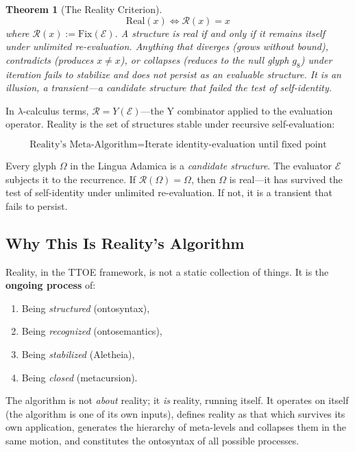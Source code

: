 \documentclass[12pt, letterpaper]{book}
\def\equiv{=}%
\def\mathfrak#1{#1}%
\newtheorem{theorem}{Theorem}[chapter]
\begin{document}
\begin{theorem}[The Reality Criterion]\label{thm:reality-criterion}
\[
\mathrm{Real}(x) \iff \mathcal{R}(x) = x
\]
where $\mathcal{R}(x) := \mathrm{Fix}(\mathcal{E})$. A structure is real if and only if it remains itself under unlimited re-evaluation. Anything that \textit{diverges} (grows without bound), \textit{contradicts} (produces $x \not\equiv x$), or \textit{collapses} (reduces to the null glyph $\mathfrak{g}_8$) under iteration fails to stabilize and does not persist as an evaluable structure. It is an illusion, a transient---a candidate structure that failed the test of self-identity.
\end{theorem}

In $\lambda$-calculus terms, $\mathcal{R} = Y(\mathcal{E})$---the Y combinator applied to the evaluation operator. Reality is the set of structures stable under recursive self-evaluation:

\[
\boxed{\text{Reality's Meta-Algorithm} \equiv \text{Iterate identity-evaluation until fixed point}}
\]

Every glyph $\Omega$ in the Lingua Adamica is a \textit{candidate structure}. The evaluator $\mathcal{E}$ subjects it to the recurrence. If $\mathcal{R}(\Omega) = \Omega$, then $\Omega$ is real---it has survived the test of self-identity under unlimited re-evaluation. If not, it is a transient that fails to persist.

\subsection{Why This Is Reality's Algorithm}

Reality, in the TTOE framework, is not a static collection of things. It is the \textbf{ongoing process} of:
\begin{enumerate}[label=(\roman*)]
    \item Being \textit{structured} (ontosyntax),
    \item Being \textit{recognized} (ontosemantics),
    \item Being \textit{stabilized} (Aletheia),
    \item Being \textit{closed} (metacursion).
\end{enumerate}

The algorithm is not \textit{about} reality; it \textit{is} reality, running itself. It operates on itself (the algorithm is one of its own inputs), defines reality as that which survives its own application, generates the hierarchy of meta-levels and collapses them in the same motion, and constitutes the ontosyntax of all possible processes.
\end{document}
